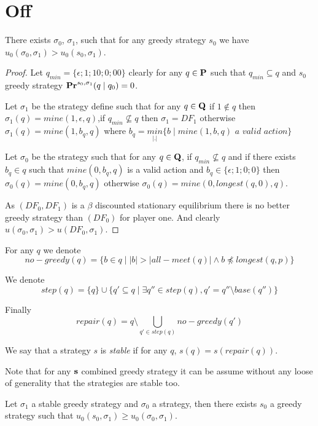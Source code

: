 
\section{Off}

\begin{myprop}
	There exists $\sigma_0$, $\sigma_1$, such that for any greedy strategy $s_0$ we have $u_0(\sigma_0,\sigma_1) > u_0(s_0,\sigma_1)$.
\end{myprop}
\begin{proof}
	Let $q_{min} = \{\epsilon; 1;10;0;00\}$ clearly for any $q \in \mathbf{P}$ such that $q_{min} \subseteq q$ and $s_0$ greedy strategy $\mathbf{Pr}^{s_0,\sigma_1}(q \mid q_0) = 0$.
	
	Let $\sigma_1$ be the strategy define such that for any $q \in \mathbf{Q}$ if $1 \notin q$ then $\sigma_1(q) = mine(1,\epsilon,q)  $,if $q_{min} \not \subseteq q$ then $\sigma_1 = DF_1$ otherwise $\sigma_1(q) = mine(1,b_{q},q)$ where $b_{q} = \underset{|.|}{min}\{ b \mid mine(1,b,q) \textit{ a valid action}\}$
	
	Let $\sigma_0$ be the strategy such that for any $q \in \mathbf{Q}$, if $q_{min} \not \subseteq q$ and if there exists $b_q \in q$ such that $mine(0,b_q,q)$ is a valid action and $b_q \in \{\epsilon; 1;0;0\}$ then $\sigma_0(q) = mine(0,b_q,q)$ otherwise  $\sigma_0(q) = mine(0,longest(q,0),q)$.
	
	As $(DF_0,DF_1)$ is a $\beta$ discounted stationary equilibrium there is no better greedy strategy than $(DF_0)$ for player one. And clearly $u(\sigma_0,\sigma_1) > u(DF_0,\sigma_1)$.
\end{proof}

For any $q$ we denote $$no-greedy(q) = \{ b \in q \mid |b| > |all-meet(q)| \land  b \not \preceq longest(q,p) \}$$

We denote $$step(q) = \{q\} \cup \{ q' \subseteq q \mid \exists q'' \in step(q), q' = q'' \setminus base(q'') \}$$

Finally $$repair(q) = q \setminus \bigcup_{q' \in step(q)} no-greedy(q')$$
\begin{mydef}\label{def-stable}
	We say that a strategy $s$ is \textit{stable} if for any $q$, $s(q) = s(repair(q))$.
\end{mydef}
Note that for any $\mathbf{s}$ combined greedy strategy it can be assume without any loose of generality that the strategies are stable too.




\begin{myprop}
	Let $\sigma_1$ a stable greedy strategy and $\sigma_0$ a strategy, then there exists $s_0$ a greedy strategy such that $u_0(s_0,\sigma_1) \geq u_0(\sigma_0,\sigma_1)$.
\end{myprop}

